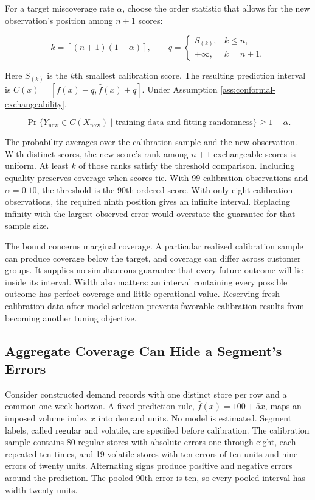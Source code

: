 For a target miscoverage rate \(\alpha\), choose the order statistic
that allows for the new observation's position among \(n+1\) scores:

\[
k=\left\lceil(n+1)(1-\alpha)\right\rceil,\qquad
q=\begin{cases}S_{(k)},&k\leq n,\\+\infty,&k=n+1.\end{cases}
\]

Here \(S_{(k)}\) is the \(k\)th smallest calibration score. The
resulting prediction interval is
\(C(x)=[\widehat f(x)-q,\widehat f(x)+q]\). Under Assumption
\ref{ass:conformal-exchangeability},

\[
\Pr\{Y_{\mathrm{new}}\in C(X_{\mathrm{new}})\mid\text{training data and fitting randomness}\}\geq 1-\alpha.
\]

The probability averages over the calibration sample and the new
observation. With distinct scores, the new score's rank among \(n+1\)
exchangeable scores is uniform. At least \(k\) of those ranks satisfy
the threshold comparison. Including equality preserves coverage when
scores tie. With 99 calibration observations and \(\alpha=0.10\), the
threshold is the 90th ordered score. With only eight calibration
observations, the required ninth position gives an infinite interval.
Replacing infinity with the largest observed error would overstate the
guarantee for that sample size.

The bound concerns marginal coverage. A particular realized calibration
sample can produce coverage below the target, and coverage can differ
across customer groups. It supplies no simultaneous guarantee that every
future outcome will lie inside its interval. Width also matters: an
interval containing every possible outcome has perfect coverage and
little operational value. Reserving fresh calibration data after model
selection prevents favorable calibration results from becoming another
tuning objective.

\hypertarget{M07-aggregate-coverage-can-hide-a-segments-errors}{%
\subsection{Aggregate Coverage Can Hide a Segment's
Errors}\label{M07-aggregate-coverage-can-hide-a-segments-errors}}

\noindent \noindent Consider constructed demand records with one distinct store
per row and a common one-week horizon. A fixed prediction rule,
\(\widehat f(x)=100+5x\), maps an imposed volume index \(x\) into demand
units. No model is estimated. Segment labels, called regular and
volatile, are specified before calibration. The calibration sample
contains 80 regular stores with absolute errors one through eight, each
repeated ten times, and 19 volatile stores with ten errors of ten units
and nine errors of twenty units. Alternating signs produce positive and
negative errors around the prediction. The pooled 90th error is ten, so
every pooled interval has width twenty units.

